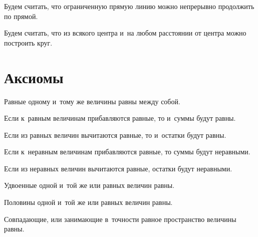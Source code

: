 \documentclass[letters]{byrne-book}
\begin{document}
\startpostulate{}\label{post:I.II}
\begin{center}
Будем считать, что ограниченную прямую линию можно непрерывно продолжить по прямой.
\end{center}

\startpostulate{}\label{post:I.III}
\begin{center}
Будем считать, что из всякого центра и~на любом расстоянии от центра можно построить круг.
\end{center}

\chapter*{Аксиомы}

\startaxiom{}\label{ax:I.I}
\begin{center}
Равные одному и~тому же величины равны между собой.
\end{center}

\startaxiom{}\label{ax:I.II}
\begin{center}
Если к~равным величинам прибавляются равные, то и~суммы будут равны.
\end{center}

\startaxiom{}\label{ax:I.III}
\begin{center}
Если из равных величин вычитаются равные, то и~остатки будут равны.
\end{center}

\startaxiom{}\label{ax:I.IV}
\begin{center}
Если к~неравным величинам прибавляются равные, то суммы будут неравными.
\end{center}

\startaxiom{}\label{ax:I.V}
\begin{center}
Если из неравных величин вычитаются  равные, остатки будут неравными.
\end{center}

\startaxiom{}\label{ax:I.VI}
\begin{center}
Удвоенные одной и~той же или равных величин равны.
\end{center}

\startaxiom{}\label{ax:I.VII}
\begin{center}
Половины одной и~той же или равных величин равны.
\end{center}

\startaxiom{}\label{ax:I.VIII}
\begin{center}
Совпадающие, или занимающие в~точности равное пространство величины равны.
\end{center}
\end{document}

